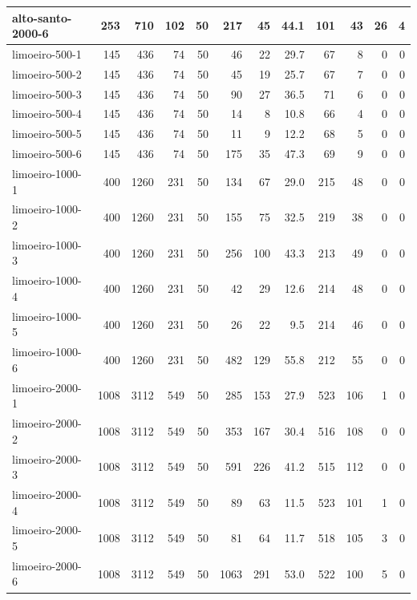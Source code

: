 \begin{landscape}
\begin{table}[!ht]
{\begin{tabular}{lrrrrrrrrrrr}
        alto-santo-2000-6 & 253  & 710  & 102 & 50 & 217  & 45  & 44.1 & 101 & 43  & 26 & 4 \\ \hline
        limoeiro-500-1    & 145  & 436  & 74  & 50 & 46   & 22  & 29.7 & 67  & 8   & 0  & 0 \\
        limoeiro-500-2    & 145  & 436  & 74  & 50 & 45   & 19  & 25.7 & 67  & 7   & 0  & 0 \\
        limoeiro-500-3    & 145  & 436  & 74  & 50 & 90   & 27  & 36.5 & 71  & 6   & 0  & 0 \\
        limoeiro-500-4    & 145  & 436  & 74  & 50 & 14   & 8   & 10.8 & 66  & 4   & 0  & 0 \\
        limoeiro-500-5    & 145  & 436  & 74  & 50 & 11   & 9   & 12.2 & 68  & 5   & 0  & 0 \\
        limoeiro-500-6    & 145  & 436  & 74  & 50 & 175  & 35  & 47.3 & 69  & 9   & 0  & 0 \\ \hline
        limoeiro-1000-1   & 400  & 1260 & 231 & 50 & 134  & 67  & 29.0 & 215 & 48  & 0  & 0 \\
        limoeiro-1000-2   & 400  & 1260 & 231 & 50 & 155  & 75  & 32.5 & 219 & 38  & 0  & 0 \\
        limoeiro-1000-3   & 400  & 1260 & 231 & 50 & 256  & 100 & 43.3 & 213 & 49  & 0  & 0 \\
        limoeiro-1000-4   & 400  & 1260 & 231 & 50 & 42   & 29  & 12.6 & 214 & 48  & 0  & 0 \\
        limoeiro-1000-5   & 400  & 1260 & 231 & 50 & 26   & 22  & 9.5  & 214 & 46  & 0  & 0 \\
        limoeiro-1000-6   & 400  & 1260 & 231 & 50 & 482  & 129 & 55.8 & 212 & 55  & 0  & 0 \\ \hline
        limoeiro-2000-1   & 1008 & 3112 & 549 & 50 & 285  & 153 & 27.9 & 523 & 106 & 1  & 0 \\
        limoeiro-2000-2   & 1008 & 3112 & 549 & 50 & 353  & 167 & 30.4 & 516 & 108 & 0  & 0 \\
        limoeiro-2000-3   & 1008 & 3112 & 549 & 50 & 591  & 226 & 41.2 & 515 & 112 & 0  & 0 \\
        limoeiro-2000-4   & 1008 & 3112 & 549 & 50 & 89   & 63  & 11.5 & 523 & 101 & 1  & 0 \\
        limoeiro-2000-5   & 1008 & 3112 & 549 & 50 & 81   & 64  & 11.7 & 518 & 105 & 3  & 0 \\
        limoeiro-2000-6   & 1008 & 3112 & 549 & 50 & 1063 & 291 & 53.0 & 522 & 100 & 5  & 0 \\ \hline
        \end{tabular}
    }
    \end{table}
\end{landscape}

